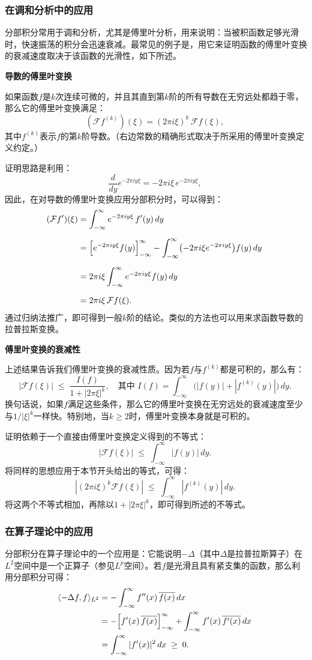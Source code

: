 \subsubsection{在调和分析中的应用}
分部积分常用于调和分析，尤其是傅里叶分析，用来说明：当被积函数足够光滑时，快速振荡的积分会迅速衰减。最常见的例子是，用它来证明函数的傅里叶变换的衰减速度取决于该函数的光滑性，如下所述。

\textbf{导数的傅里叶变换}

如果函数$f$是$k$次连续可微的，并且其直到第$k$阶的所有导数在无穷远处都趋于零，那么它的傅里叶变换满足：
$$
(\mathcal{F}f^{(k)})(\xi) = (2\pi i \xi)^{k}\,\mathcal{F}f(\xi),~
$$
其中$f^{(k)}$表示$f$的第$k$阶导数。（右边常数的精确形式取决于所采用的傅里叶变换定义约定。）

证明思路是利用：
$$
\frac{d}{dy}e^{-2\pi i y \xi} = -2\pi i \xi \, e^{-2\pi i y \xi},~
$$
因此，在对导数的傅里叶变换应用分部积分时，可以得到：
$$
\begin{aligned}
(\mathcal{F}f')(\xi) 
&= \int_{-\infty}^{\infty} e^{-2\pi i y \xi}\,f'(y)\,dy \\[6pt]
&= \Bigl[e^{-2\pi i y \xi} f(y)\Bigr]_{-\infty}^{\infty}
   - \int_{-\infty}^{\infty} \bigl(-2\pi i \xi e^{-2\pi i y \xi}\bigr) f(y)\,dy \\[6pt]
&= 2\pi i \xi \int_{-\infty}^{\infty} e^{-2\pi i y \xi} f(y)\,dy \\[6pt]
&= 2\pi i \xi \,\mathcal{F}f(\xi).
\end{aligned}~
$$
通过归纳法推广，即可得到一般$k$阶的结论。类似的方法也可以用来求函数导数的拉普拉斯变换。

\textbf{傅里叶变换的衰减性}

上述结果告诉我们傅里叶变换的衰减性质。因为若$f$与$f^{(k)}$都是可积的，那么有：
$$
|{\mathcal{F}}f(\xi)| \;\leq\; \frac{I(f)}{1 + |2\pi \xi|^{k}}, 
\quad \text{其中 } I(f) = \int_{-\infty}^{\infty} \bigl(|f(y)| + |f^{(k)}(y)|\bigr)\,dy.~
$$
换句话说，如果$f$满足这些条件，那么它的傅里叶变换在无穷远处的衰减速度至少与$1/|\xi|^{k}$一样快。特别地，当$k \geq 2$时，傅里叶变换本身就是可积的。

证明依赖于一个直接由傅里叶变换定义得到的不等式：
$$
|{\mathcal{F}}f(\xi)| \;\leq\; \int_{-\infty}^{\infty} |f(y)|\,dy.~
$$
将同样的思想应用于本节开头给出的等式，可得：
$$
|(2\pi i \xi)^{k}{\mathcal{F}}f(\xi)| \;\leq\; \int_{-\infty}^{\infty} |f^{(k)}(y)|\,dy.~
$$
将这两个不等式相加，再除以$1 + |2\pi \xi|^{k}$，即可得到所述的不等式。

\subsubsection{在算子理论中的应用}
分部积分在算子理论中的一个应用是：它能说明$-\Delta$（其中$\Delta$是拉普拉斯算子）在$L^{2}$空间中是一个正算子（参见$L^p$空间）。若$f$是光滑且具有紧支集的函数，那么利用分部积分可得：
$$
\begin{aligned}
\langle -\Delta f, f \rangle_{L^{2}}
&= -\int_{-\infty}^{\infty} f''(x)\,\overline{f(x)}\,dx\\
&= -\Bigl[f'(x)\,\overline{f(x)}\Bigr]_{-\infty}^{\infty}
+ \int_{-\infty}^{\infty} f'(x)\,\overline{f'(x)}\,dx\\
&= \int_{-\infty}^{\infty} |f'(x)|^{2}\,dx \;\geq\; 0.
\end{aligned}~
$$
